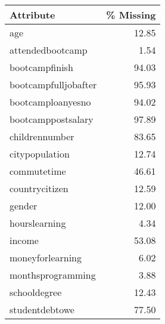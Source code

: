 \begin{tabular}{lr}
\toprule
\textbf{Attribute} &  \textbf{\% Missing} \\
\midrule
age &      12.85 \\
attendedbootcamp &       1.54 \\
 bootcampfinish &      94.03 \\
 bootcampfulljobafter &      95.93 \\
 bootcamploanyesno &      94.02 \\
 bootcamppostsalary &      97.89 \\
childrennumber &      83.65 \\
citypopulation &      12.74 \\
commutetime &      46.61 \\
countrycitizen &      12.59 \\
gender &      12.00 \\
hourslearning &       4.34 \\
income &      53.08 \\
moneyforlearning &       6.02 \\
monthsprogramming &       3.88 \\
schooldegree &      12.43 \\
studentdebtowe &      77.50 \\
\bottomrule
\end{tabular}
